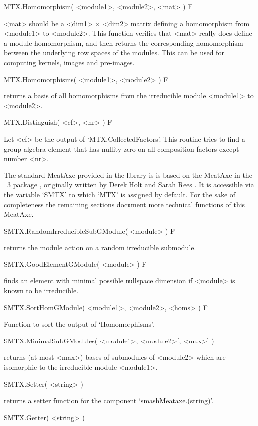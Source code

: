 \>MTX.Homomorphism( <module1>, <module2>, <mat> ) F

<mat> should be a <dim1> $\times$ <dim2> matrix defining a homomorphism
from <module1> to <module2>.  This function verifies that <mat>
really does define a module homomorphism, and then returns the
corresponding homomorphism between the underlying row spaces of the
modules. This can be used for computing kernels, images and pre-images.

\>MTX.Homomorphisms( <module1>, <module2> ) F

returns a basis of all homomorphisms from the irreducible module 
<module1> to <module2>.

\>MTX.Distinguish( <cf>, <nr> ) F

Let <cf> be the output of `MTX.CollectedFactors'. This routine
tries to find a group algebra element that has nullity zero on all
composition factors except number <nr>.


The standard MeatAxe provided in the {\GAP} library is
is based on the MeatAxe in the {\GAP}~3 package ,
originally written by Derek Holt and Sarah Rees \cite{HR94}. It is
accessible via the variable `SMTX' to which `MTX' is assigned by default. 
For the sake of completeness the remaining sections document more technical
functions of this MeatAxe.

\>SMTX.RandomIrreducibleSubGModule( <module> ) F

returns the module action on a random irreducible submodule.

\>SMTX.GoodElementGModule( <module> ) F

finds an element with minimal possible nullspace dimension if <module>
is known to be irreducible.

\>SMTX.SortHomGModule( <module1>, <module2>, <homs> ) F

Function to sort the output of `Homomorphisms'.

\>SMTX.MinimalSubGModules( <module1>, <module2>[, <max>] )

returns (at most <max>) bases of submodules of <module2> which are
isomorphic to the irreducible module  <module1>.

\>SMTX.Setter( <string> )

returns a setter function for the component `smashMeataxe.(string)'.

\>SMTX.Getter( <string> )

